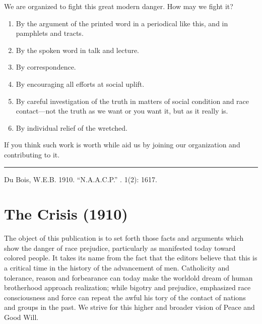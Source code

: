 \documentclass[letterpaper,10pt,english]{jupyterBook}
\begin{document}
\sphinxAtStartPar
We are organized to fight this great modern danger. How may we fight it?
\begin{enumerate}
%
\item {} 
\sphinxAtStartPar
By the argument of the printed word in a periodical like this, and in pamphlets and tracts.

\item {} 
\sphinxAtStartPar
By the spoken word in talk and lecture.

\item {} 
\sphinxAtStartPar
By correspondence.

\item {} 
\sphinxAtStartPar
By encouraging all efforts at social uplift.

\item {} 
\sphinxAtStartPar
By careful investigation of the truth in matters of social condition and race contact—not the truth as we want or you want it, but as it really is.

\item {} 
\sphinxAtStartPar
By individual relief of the wretched.

\end{enumerate}

\sphinxAtStartPar
If you think such work is worth while aid us by joining our organization and contributing to it.


\bigskip\hrule\bigskip


\sphinxAtStartPar
{} Du Bois, W.E.B. 1910. “N.A.A.C.P.”  . 1(2): 16\sphinxhyphen{}17.


\section{The Crisis (1910)}
\label{\detokenize{Volumes/01/01/TheCrisis:the-crisis-1910}}\label{\detokenize{Volumes/01/01/TheCrisis::doc}}
\sphinxAtStartPar
The object of this publication is to set forth those facts and arguments which show the danger of race prejudice, particularly as manifested to\sphinxhyphen{}day toward colored people. It takes its name from the fact that the editors believe that this is a critical time in the history of the advancement of men. Catholicity and tolerance, reason and forbearance can to\sphinxhyphen{}day make the world\sphinxhyphen{}old dream of human brotherhood approach realization; while bigotry and prejudice, emphasized race consciousness and force can repeat the awful his tory of the contact of nations and groups in the past. We strive for this higher and broader vision of Peace and Good Will.
\end{document}
